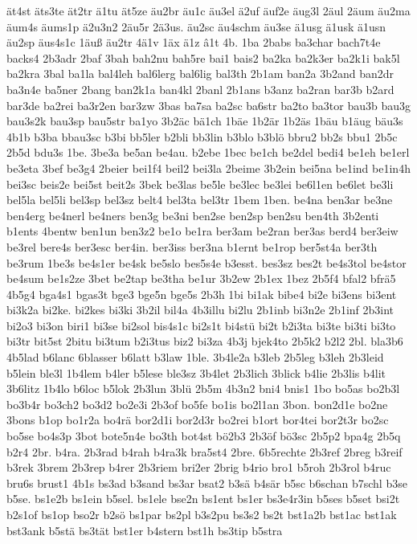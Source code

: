 {ät4st
äts3te
ät2tr
ä1tu
ät5ze
äu2br
äu1c
äu3el
ä2uf
äuf2e
äug3l
2äul
2äum
äu2ma
äum4s
äums1p
ä2u3n2
2äu5r
2ä3us.
äu2sc
äu4schm
äu3se
ä1usg
ä1usk
ä1usn
äu2sp
äus4s1c
1äuß
äu2tr
4ä1v
1äx
ä1z
â1t
4b.
1ba
2babs
ba3char
bach7t4e
backs4
2b3adr
2baf
3bah
bah2nu
bah5re
bai1
bais2
ba2ka
ba2k3er
ba2k1i
bak5l
ba2kra
3bal
ba1la
bal4leh
bal6lerg
bal6lig
bal3th
2b1am
ban2a
3b2and
ban2dr
ba3n4e
ba5ner
2bang
ban2k1a
ban4kl
2banl
2b1ans
b3anz
ba2ran
bar3b
b2ard
bar3de
ba2rei
ba3r2en
bar3zw
3bas
ba7sa
ba2sc
ba6str
ba2to
ba3tor
bau3b
bau3g
bau3s2k
bau3sp
bau5str
ba1yo
3b2äc
bä1ch
1bäe
1b2är
1b2äs
1bäu
b1äug
bäu3s
4b1b
b3ba
bbau3sc
b3bi
bb5ler
b2bli
bb3lin
b3blo
b3blö
bbru2
bb2s
bbu1
2b5c
2b5d
bdu3s
1be.
3be3a
be5an
be4au.
b2ebe
1bec
be1ch
be2del
bedi4
be1eh
be1erl
be3eta
3bef
be3g4
2beier
bei1f4
beil2
bei3la
2beime
3b2ein
bei5na
be1ind
be1in4h
bei3sc
beis2e
bei5st
beit2s
3bek
be3las
be5le
be3lec
be3lei
be6l1en
be6let
be3li
bel5la
bel5li
bel3sp
bel3sz
belt4
bel3ta
bel3tr
1bem
1ben.
be4na
ben3ar
be3ne
ben4erg
be4nerl
be4ners
ben3g
be3ni
ben2se
ben2sp
ben2su
ben4th
3b2enti
b1ents
4bentw
ben1un
ben3z2
be1o
be1ra
ber3am
be2ran
ber3as
berd4
ber3eiw
be3rel
bere4s
ber3esc
ber4in.
ber3iss
ber3na
b1ernt
be1rop
ber5st4a
ber3th
be3rum
1be3s
be4s1er
be4sk
be5slo
bes5s4e
b3esst.
bes3sz
bes2t
be4s3tol
be4stor
be4sum
be1s2ze
3bet
be2tap
be3tha
be1ur
3b2ew
2b1ex
1bez
2b5f4
bfal2
bfrä5
4b5g4
bga4s1
bgas3t
bge3
bge5n
bge5s
2b3h
1bi
bi1ak
bibe4
bi2e
bi3ens
bi3ent
bi3k2a
bi2ke.
bi2kes
bi3ki
3b2il
bil4a
4b3illu
bi2lu
2b1inb
bi3n2e
2b1inf
2b3int
bi2o3
bi3on
biri1
bi3se
bi2sol
bis4s1c
bi2s1t
bi4stü
bi2t
b2i3ta
bi3te
bi3ti
bi3to
bi3tr
bit5st
2bitu
bi3tum
b2i3tus
biz2
bi3za
4b3j
bjek4to
2b5k2
b2l2
2bl.
bla3b6
4b5lad
b6lanc
6blasser
b6latt
b3law
1ble.
3b4le2a
b3leb
2b5leg
b3leh
2b3leid
b5lein
ble3l
1b4lem
b4ler
b5lese
ble3sz
3b4let
2b3lich
3blick
b4lie
2b3lis
b4lit
3b6litz
1b4lo
b6loc
b5lok
2b3lun
3blü
2b5m
4b3n2
bni4
bnis1
1bo
bo5as
bo2b3l
bo3b4r
bo3ch2
bo3d2
bo2e3i
2b3of
bo5fe
bo1is
bo2l1an
3bon.
bon2d1e
bo2ne
3bons
b1op
bo1r2a
bo4rä
bor2d1i
bor2d3r
bo2rei
b1ort
bor4tei
bor2t3r
bo2sc
bo5se
bo4s3p
3bot
bote5n4e
bo3th
bot4st
bö2b3
2b3öf
bö3sc
2b5p2
bpa4g
2b5q
b2r4
2br.
b4ra.
2b3rad
b4rah
b4ra3k
bra5st4
2bre.
6b5rechte
2b3ref
2breg
b3reif
b3rek
3brem
2b3rep
b4rer
2b3riem
bri2er
2brig
b4rio
bro1
b5roh
2b3rol
b4ruc
bru6s
brust1
4b1s
bs3ad
b3sand
bs3ar
bsat2
b3sä
b4sär
b5sc
b6schan
b7schl
b3se
b5se.
bs1e2b
bs1ein
b5sel.
bs1ele
bse2n
bs1ent
bs1er
bs3e4r3in
b5ses
b5set
bsi2t
b2s1of
bs1op
bso2r
b2sö
bs1par
bs2pl
b3s2pu
bs3s2
bs2t
bst1a2b
bst1ac
bst1ak
bst3ank
b5stä
bs3tät
bst1er
b4stern
bst1h
bs3tip
b5stra
}
